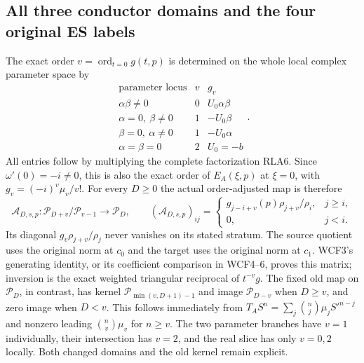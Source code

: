 \subsection{All three conductor domains and the four original ES labels}

The exact order $v=\operatorname{ord}_{t=0}g(t,p)$ is determined
on the whole local complex parameter space by
\[
\begin{array}{c|c|c}
 \text{parameter locus}&v&g_v\\\hline
 \alpha\beta\ne0&0&U_0\alpha\beta\\
 \alpha=0,\ \beta\ne0&1&-U_0\beta\\
 \beta=0,\ \alpha\ne0&1&-U_0\alpha\\
 \alpha=\beta=0&2&U_0=-b
\end{array}.
 \tag{RLA29}
\]
All entries follow by multiplying the complete factorization RLA6.
Since $\omega'(0)=-i\ne0$, this is also the exact order of
$E_A(\xi,p)$ at $\xi=0$, with $g_v=(-i)^v\mu_v/v!$.
For every $D\ge0$ the actual order-adjusted map is therefore
\[
 \mathcal A_{D,s,p}:\mathcal P_{D+v}/\mathcal P_{v-1}
       \longrightarrow\mathcal P_D,\qquad
 (\mathcal A_{D,s,p})_{ij}=
 \begin{cases}g_{j-i+v}(p)\rho_{j+v}/\rho_i,&j\ge i,\\0,&j<i.
 \end{cases}
 \tag{RLA30}
\]
Its diagonal $g_v\rho_{j+v}/\rho_j$ never vanishes on its stated
stratum.  The source quotient uses the original norm at $c_0$ and
the target uses the original norm at $c_1$.  WCF3's generating
identity, or its coefficient comparison in WCF4--6, proves this
matrix; inversion is the exact weighted triangular reciprocal of
$t^{-v}g$.  The fixed old map on $\mathcal P_D$, in contrast, has
kernel $\mathcal P_{\min(v,D+1)-1}$ and image
$\mathcal P_{D-v}$ when $D\ge v$, and zero image when $D<v$.
This follows immediately from
$T_AS^n=\sum_j\binom nj\mu_jS'^{n-j}$ and nonzero leading
$\binom nv\mu_v$ for $n\ge v$.
The two parameter branches have $v=1$ individually, their
intersection has $v=2$, and the real slice has only $v=0,2$ locally.
Both changed domains and the old kernel remain explicit.

